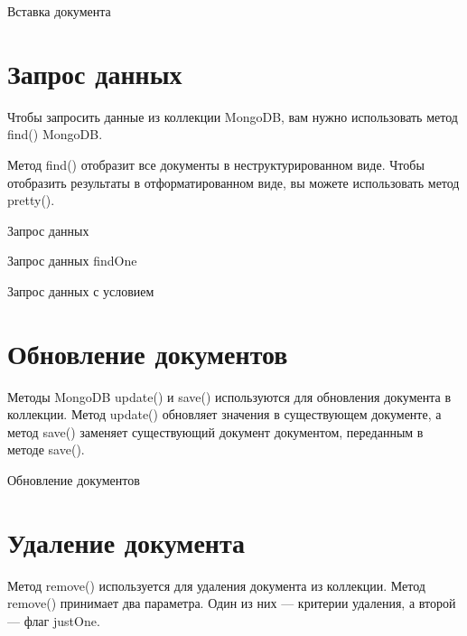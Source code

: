 \begin{image}
	\caption{Вставка документа}
	\label{fig:insert}
\end{image}

\clearpage
\section{Запрос данных}

Чтобы запросить данные из коллекции MongoDB, вам нужно
использовать метод find() MongoDB.\par
Метод find() отобразит все документы в неструктурированном виде.
Чтобы отобразить результаты в отформатированном виде, вы можете
использовать метод pretty().

\begin{image}
	\caption{Запрос данных}
	\label{fig:find}
\end{image}

\begin{image}
	\caption{Запрос данных findOne}
	\label{fig:find:one}
\end{image}

\begin{image}
	\caption{Запрос данных с условием}
	\label{fig:find:like}
\end{image}

\clearpage
\section{Обновление документов}

Методы MongoDB update() и save() используются для обновления
документа в коллекции. Метод update() обновляет значения в существующем 
документе, а метод save() заменяет существующий документ документом,
переданным в методе save().

\begin{image}
	\caption{Обновление документов}
	\label{fig:update}
\end{image}

\clearpage
\section{Удаление документа}

Метод remove() используется для удаления документа из
коллекции. Метод remove() принимает два параметра. Один из них — критерии
удаления, а второй — флаг justOne.

